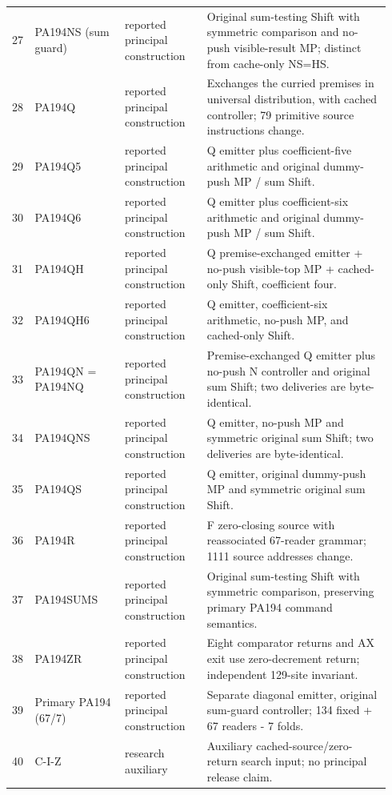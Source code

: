 \begin{longtable}{p{0.035\linewidth}p{0.23\linewidth}p{0.21\linewidth}p{0.47\linewidth}}
27 & PA194NS (sum guard) & reported principal construction & Original sum-testing Shift with symmetric comparison and no-push visible-result MP; distinct from cache-only NS=HS.\\[4pt]
28 & PA194Q & reported principal construction & Exchanges the curried premises in universal distribution, with cached controller; 79 primitive source instructions change.\\[4pt]
29 & PA194Q5 & reported principal construction & Q emitter plus coefficient-five arithmetic and original dummy-push MP / sum Shift.\\[4pt]
30 & PA194Q6 & reported principal construction & Q emitter plus coefficient-six arithmetic and original dummy-push MP / sum Shift.\\[4pt]
31 & PA194QH & reported principal construction & Q premise-exchanged emitter + no-push visible-top MP + cached-only Shift, coefficient four.\\[4pt]
32 & PA194QH6 & reported principal construction & Q emitter, coefficient-six arithmetic, no-push MP, and cached-only Shift.\\[4pt]
33 & PA194QN = PA194NQ & reported principal construction & Premise-exchanged Q emitter plus no-push N controller and original sum Shift; two deliveries are byte-identical.\\[4pt]
34 & PA194QNS & reported principal construction & Q emitter, no-push MP and symmetric original sum Shift; two deliveries are byte-identical.\\[4pt]
35 & PA194QS & reported principal construction & Q emitter, original dummy-push MP and symmetric original sum Shift.\\[4pt]
36 & PA194R & reported principal construction & F zero-closing source with reassociated 67-reader grammar; 1111 source addresses change.\\[4pt]
37 & PA194SUMS & reported principal construction & Original sum-testing Shift with symmetric comparison, preserving primary PA194 command semantics.\\[4pt]
38 & PA194ZR & reported principal construction & Eight comparator returns and AX exit use zero-decrement return; independent 129-site invariant.\\[4pt]
39 & Primary PA194 (67/7) & reported principal construction & Separate diagonal emitter, original sum-guard controller; 134 fixed + 67 readers - 7 folds.\\[4pt]
40 & C-I-Z & research auxiliary & Auxiliary cached-source/zero-return search input; no principal release claim.\\[4pt]

\end{longtable}
